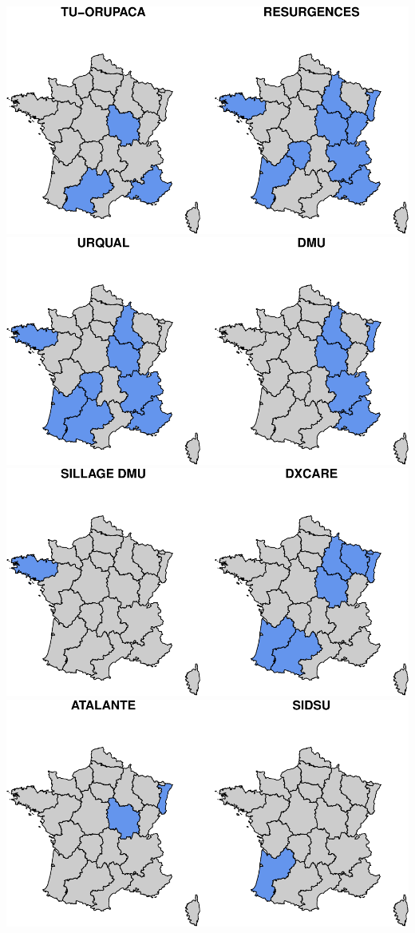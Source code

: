 \documentclass[]{article}
\begin{document}
\includegraphics{septembre2015_files/figure-latex/unnamed-chunk-11-1.pdf}
\includegraphics{septembre2015_files/figure-latex/unnamed-chunk-11-2.pdf}
\includegraphics{septembre2015_files/figure-latex/unnamed-chunk-11-3.pdf}
\includegraphics{septembre2015_files/figure-latex/unnamed-chunk-11-4.pdf}
\end{document}
